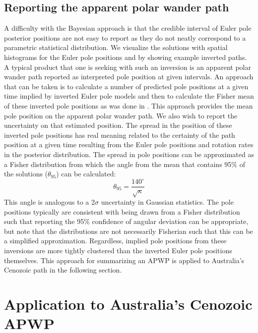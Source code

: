 \documentclass[]{agujournal2019}
\begin{document}
\subsection{Reporting the apparent polar wander path}
\label{sec:age_uncertainty}
A difficulty with the Bayesian approach is that the credible interval of Euler pole posterior positions are not easy to report as they do not neatly correspond to a parametric statistical distribution. We visualize the solutions with spatial histograms for the Euler pole positions and by showing example inverted paths. A typical product that one is seeking with such an inversion is an apparent polar wander path reported as interpreted pole position at given intervals. An approach that can be taken is to calculate a number of predicted pole positions at a given time implied by inverted Euler pole models and then to calculate the Fisher mean of these inverted pole positions as was done in . This approach provides the mean pole position on the apparent polar wander path. We also wish to report the uncertainty on that estimated position. The spread in the position of these inverted pole positions has real meaning related to the certainty of the path position at a given time resulting from the Euler pole positions and rotation rates in the posterior distribution. The spread in pole positions can be approximated as a Fisher distribution from which the angle from the mean that contains 95$\%$ of the solutions ($\theta_{95}$) can be calculated:
\begin{equation}
\theta_{95}=\frac{140^{\circ}}{\sqrt{\kappa}}
\label{eq:angular_deviation}
\end{equation}
This angle is analogous to a 2$\sigma$ uncertainty in Gaussian statistics.  The pole positions typically are consistent with being drawn from a Fisher distribution such that reporting the 95$\%$ confidence of angular deviation can be appropriate, but note that the distributions are not necessarily Fisherian such that this can be a simplified approximation. Regardless, implied pole positions from these inversions are more tightly clustered than the inverted Euler pole positions themselves. This approach for summarizing an APWP is applied to Australia's Cenozoic path in the following section.

\section{Application to Australia's Cenozoic APWP}
\label{sec:australia}
\end{document}
